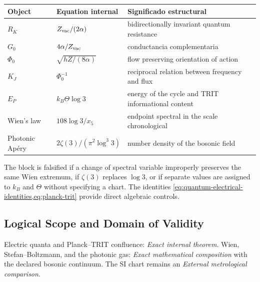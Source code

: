 \begin{longtable}{@{}p{}p{}p{}@{}}
\toprule
Object & Equation internal & Significado estructural\\
\midrule
\endhead
\(R_K\) & \(Z_{\rm vac}/(2\alpha)\) & bidirectionally invariant quantum resistance\\
\(G_0\) & \(4\alpha/Z_{\rm vac}\) & conductancia complementaria\\
\(\Phi_0\) & \(\sqrt{hZ/(8\alpha)}\) & flow preserving orientation of action\\
\(K_J\) & \(\Phi_0^{-1}\) & reciprocal relation between frequency and flux\\
\(E_P\) & \(k_B\Theta\log3\) & energy of the cycle and TRIT informational content\\
Wien's law & \(108\log3/x_5\) & endpoint spectral in the scale chronological\\
Photonic Apéry & \(2\zeta(3)/(\pi^2\log^3 3)\) & number density of the bosonic field\\
\bottomrule
\end{longtable}

\begin{remark}
The block is falsified if a change of spectral variable improperly preserves
the same Wien extremum, if \(\zeta(3)\) replaces
\(\log3\), or if separate values are assigned to \(k_B\) and \(\Theta\) without
specifying a chart. The identities
\cref{eq:quantum-electrical-identities,eq:planck-trit} provide direct
algebraic controls.
\end{remark}

\subsection*{Logical Scope and Domain of Validity}
Electric quanta and Planck--TRIT confluence: \emph{Exact internal theorem}. Wien, Stefan--Boltzmann, and the photonic gas: \emph{Exact mathematical composition} with the declared bosonic continuum. The SI chart remains an \emph{External metrological comparison}.

